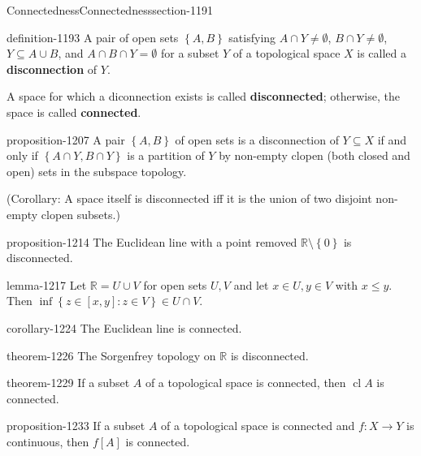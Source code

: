 \documentclass[oneside,10pt,]{article}
\newcommand{\terminology}[1]{\textbf{#1}}
\newcommand{\mb}{\mathbb}
\newcommand{\cl}{\operatorname{cl}}
\newcommand{\setBuilder}[2]{\left\{#1:#2\right\}}
\newcommand{\setList}[1]{\left\{#1\right\}}
\begin{document}
\begin{sectionptx}{Connectedness}{}{Connectedness}{}{}{section-1191}
\begin{definition}{}{definition-1193}%
\hypertarget{p-1194}{}%
A pair of open sets \(\setList{A,B}\) satisfying \(A\cap Y\not=\emptyset\), \(B\cap Y\not=\emptyset\), \(Y\subseteq A\cup B\), and \(A\cap B\cap Y=\emptyset\) for a subset \(Y\) of a topological space \(X\) is called a \terminology{disconnection} of \(Y\).%
\par
\hypertarget{p-1204}{}%
A space for which a diconnection exists is called \terminology{disconnected}; otherwise, the space is called \terminology{connected}.%
\end{definition}
\begin{proposition}{}{}{proposition-1207}%
\hypertarget{p-1208}{}%
A pair \(\setList{A,B}\) of open sets is a disconnection of \(Y\subseteq X\) if and only if \(\setList{A\cap Y,B\cap Y}\) is a partition of \(Y\) by non-empty clopen (both closed and open) sets in the subspace topology.%
\end{proposition}
\hypertarget{p-1213}{}%
(Corollary: A space itself is disconnected iff it is the union of two disjoint non-empty clopen subsets.)%
\begin{proposition}{}{}{proposition-1214}%
\hypertarget{p-1215}{}%
The Euclidean line with a point removed \(\mb R\setminus\setList{0}\) is disconnected.%
\end{proposition}
\begin{lemma}{}{}{lemma-1217}%
\hypertarget{p-1218}{}%
Let \(\mb R=U\cup V\) for open sets \(U,V\) and let \(x\in U,y\in V\) with \(x\leq y\).  Then \(\inf\setBuilder{z\in[x,y]}{z\in V}\in U\cap V\).%
\end{lemma}
\begin{corollary}{}{}{corollary-1224}%
\hypertarget{p-1225}{}%
The Euclidean line is connected.%
\end{corollary}
\begin{theorem}{}{}{theorem-1226}%
\hypertarget{p-1227}{}%
The Sorgenfrey topology on \(\mb R\) is disconnected.%
\end{theorem}
\begin{theorem}{}{}{theorem-1229}%
\hypertarget{p-1230}{}%
If a subset \(A\) of a topological space is connected, then \(\cl A\) is connected.%
\end{theorem}
\begin{proposition}{}{}{proposition-1233}%
\hypertarget{p-1234}{}%
If a subset \(A\) of a topological space is connected and \(f:X\to Y\) is continuous, then \(f[A]\) is connected.%

\end{proposition}
\end{sectionptx}
\end{document}
